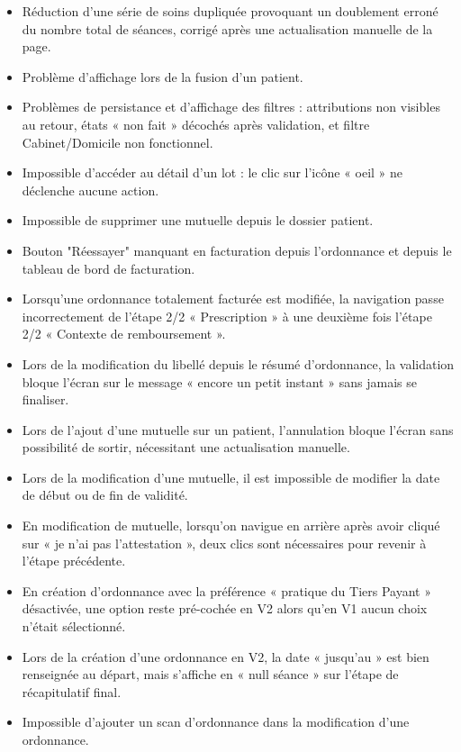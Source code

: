 \documentclass{article}
\begin{document}
\begin{itemize}
    \item Réduction d'une série de soins dupliquée provoquant un doublement erroné du nombre total de séances, corrigé après une actualisation manuelle de la page.
    \item Problème d'affichage lors de la fusion d'un patient.
    \item Problèmes de persistance et d'affichage des filtres : attributions non visibles au retour, états « non fait » décochés après validation, et filtre Cabinet/Domicile non fonctionnel.
    \item Impossible d'accéder au détail d'un lot : le clic sur l'icône « oeil » ne déclenche aucune action.
    \item Impossible de supprimer une mutuelle depuis le dossier patient.
    \item Bouton "Réessayer" manquant en facturation depuis l'ordonnance et depuis le tableau de bord de facturation.
    \item Lorsqu'une ordonnance totalement facturée est modifiée, la navigation passe incorrectement de l'étape 2/2 « Prescription » à une deuxième fois l'étape 2/2 « Contexte de remboursement ».
    \item Lors de la modification du libellé depuis le résumé d'ordonnance, la validation bloque l'écran sur le message « encore un petit instant » sans jamais se finaliser.
    \item Lors de l'ajout d'une mutuelle sur un patient, l'annulation bloque l'écran sans possibilité de sortir, nécessitant une actualisation manuelle.
    \item Lors de la modification d'une mutuelle, il est impossible de modifier la date de début ou de fin de validité.
    \item En modification de mutuelle, lorsqu'on navigue en arrière après avoir cliqué sur « je n'ai pas l'attestation », deux clics sont nécessaires pour revenir à l'étape précédente.
    \item En création d'ordonnance avec la préférence « pratique du Tiers Payant » désactivée, une option reste pré-cochée en V2 alors qu'en V1 aucun choix n'était sélectionné.
    \item Lors de la création d'une ordonnance en V2, la date « jusqu'au » est bien renseignée au départ, mais s'affiche en « null séance » sur l'étape de récapitulatif final.
    \item Impossible d'ajouter un scan d'ordonnance dans la modification d'une ordonnance.
\end{itemize}
\end{document}
